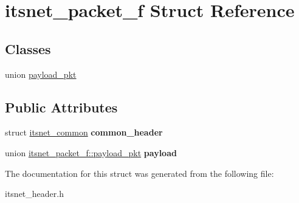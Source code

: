 \hypertarget{structitsnet__packet__f}{\section{itsnet\-\_\-packet\-\_\-f \-Struct \-Reference}
\label{structitsnet__packet__f}
}
\subsection*{\-Classes}
\begin{DoxyCompactItemize}
\item 
union \hyperlink{unionitsnet__packet__f_1_1payload__pkt}{payload\-\_\-pkt}
\end{DoxyCompactItemize}
\subsection*{\-Public \-Attributes}
\begin{DoxyCompactItemize}
\item 
\hypertarget{structitsnet__packet__f_ac4ac150ea480bb8eae377164c0da1b4f}{struct \hyperlink{structitsnet__common}{itsnet\-\_\-common} {\bfseries common\-\_\-header}}\label{structitsnet__packet__f_ac4ac150ea480bb8eae377164c0da1b4f}

\item 
\hypertarget{structitsnet__packet__f_a62af4191a9dcb92e22025fb9a6d10a9d}{union \hyperlink{unionitsnet__packet__f_1_1payload__pkt}{itsnet\-\_\-packet\-\_\-f\-::payload\-\_\-pkt} {\bfseries payload}}\label{structitsnet__packet__f_a62af4191a9dcb92e22025fb9a6d10a9d}

\end{DoxyCompactItemize}


\-The documentation for this struct was generated from the following file\-:\begin{DoxyCompactItemize}
\item 
itsnet\-\_\-header.\-h\end{DoxyCompactItemize}
